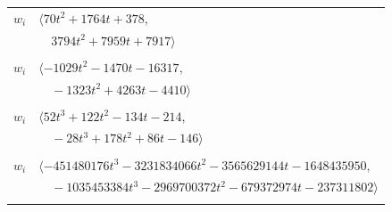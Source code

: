 \documentclass[11pt]{article}
\begin{document}
\begin{longtable}{@{}ll@{}}
$w_i$ & $\langle 70t^{2}+1764t+378,$\\
 & $\quad 3794t^{2}+7959t+7917\rangle$\\
\addlinespace[2pt]
\multicolumn{2}{@{}p{0.97\textwidth}@{}}{$i=37$, $D_i=1$, $\rho_{ij}$: $3{:}2, \allowbreak 9{:}1, \allowbreak 21{:}2, \allowbreak 23{:}2, \allowbreak 24{:}1, \allowbreak 29{:}1, \allowbreak 35{:}1, \allowbreak 43{:}2, \allowbreak 59{:}1, \allowbreak 61{:}2, \allowbreak 68{:}2, \allowbreak 69{:}1, \allowbreak 70{:}2, \allowbreak 72{:}2, \allowbreak 75{:}2, \allowbreak 81{:}1, \allowbreak 90{:}1, \allowbreak 91{:}2, \allowbreak 93{:}1, \allowbreak 97{:}1$}\\
$w_i$ & $\langle -1029t^{2}-1470t-16317,$\\
 & $\quad -1323t^{2}+4263t-4410\rangle$\\
\addlinespace[2pt]
\multicolumn{2}{@{}p{0.97\textwidth}@{}}{$i=38$, $D_i=1$, $\rho_{ij}$: $2{:}2, \allowbreak 12{:}2, \allowbreak 18{:}1, \allowbreak 24{:}1, \allowbreak 26{:}1, \allowbreak 33{:}2, \allowbreak 40{:}1, \allowbreak 47{:}2, \allowbreak 48{:}2, \allowbreak 63{:}2$}\\
$w_i$ & $\langle 52t^{3}+122t^{2}-134t-214,$\\
 & $\quad -28t^{3}+178t^{2}+86t-146\rangle$\\
\addlinespace[2pt]
\multicolumn{2}{@{}p{0.97\textwidth}@{}}{$i=39$, $D_i=1$, $\rho_{ij}$: $1{:}1, \allowbreak 11{:}1, \allowbreak 13{:}1, \allowbreak 17{:}2, \allowbreak 25{:}2, \allowbreak 27{:}2, \allowbreak 30{:}2, \allowbreak 31{:}2, \allowbreak 33{:}2, \allowbreak 40{:}2, \allowbreak 46{:}2, \allowbreak 56{:}1, \allowbreak 57{:}1, \allowbreak 58{:}1, \allowbreak 61{:}1, \allowbreak 65{:}2, \allowbreak 68{:}1, \allowbreak 70{:}2, \allowbreak 71{:}1, \allowbreak 76{:}1, \allowbreak 77{:}2, \allowbreak 79{:}2, \allowbreak 84{:}1, \allowbreak 86{:}1, \allowbreak 96{:}2, \allowbreak 97{:}1$}\\
$w_i$ & $\langle -451480176t^{3}-3231834066t^{2}-3565629144t-1648435950,$\\
 & $\quad -1035453384t^{3}-2969700372t^{2}-679372974t-237311802\rangle$\\
\addlinespace[2pt]
\multicolumn{2}{@{}p{0.97\textwidth}@{}}{$i=40$, $D_i=1$, $\rho_{ij}$: $1{:}2, \allowbreak 6{:}1, \allowbreak 9{:}2, \allowbreak 12{:}1, \allowbreak 13{:}2, \allowbreak 16{:}1, \allowbreak 22{:}2, \allowbreak 23{:}1, \allowbreak 25{:}1, \allowbreak 26{:}1, \allowbreak 30{:}1, \allowbreak 31{:}1, \allowbreak 34{:}1, \allowbreak 38{:}2, \allowbreak 39{:}1, \allowbreak 44{:}2, \allowbreak 56{:}2, \allowbreak 60{:}2, \allowbreak 62{:}1, \allowbreak 63{:}2, \allowbreak 64{:}2, \allowbreak 71{:}2, \allowbreak 79{:}1, \allowbreak 88{:}1, \allowbreak 93{:}2, \allowbreak 94{:}2$}\\

\end{longtable}
\end{document}
